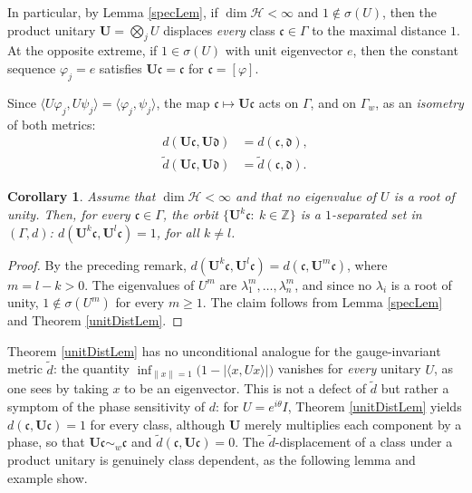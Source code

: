 \documentclass[twoside,11pt,letter]{article}
\def\bZ{\mathbb{Z}}
\def\cH{{\mathcal{H}}}
\def\fc{{\mathfrak{c}}}
\def\fd{{\mathfrak{d}}}
\newtheorem{corollary}[theorem]{Corollary}
\theoremstyle{definition}
\theoremstyle{definition}
\theoremstyle{plain}
\newenvironment{remark}[1][Remark.]{\begin{trivlist}
\item[\hskip \labelsep {\bfseries #1}]}{\end{trivlist}}
\begin{document}
\begin{remark}
In particular, by Lemma \ref{specLem}, if $\dim\cH<\infty$ and $1\notin\sigma(U)$, then the product unitary $\mathbf{U}=\bigotimes_j U$ displaces \emph{every} class $\fc\in\Gamma$ to the maximal distance $1$. At the opposite extreme, if $1\in\sigma(U)$ with unit eigenvector $e$, then the constant sequence $\varphi_j=e$ satisfies $\mathbf{U}\fc=\fc$ for $\fc=[\varphi]$.
\end{remark}

\begin{remark}
Since $\langle U\varphi_j,U\psi_j\rangle=\langle\varphi_j,\psi_j\rangle$, the map $\fc\mapsto\mathbf{U}\fc$ acts on $\Gamma$, and on $\Gamma_w$, as an \emph{isometry} of both metrics:
\begin{equation*}
\begin{split}
d(\mathbf{U}\fc,\mathbf{U}\fd)&=d(\fc,\fd),\\
\tilde d(\mathbf{U}\fc,\mathbf{U}\fd)&=\tilde d(\fc,\fd).
\end{split}
\end{equation*}
\end{remark}

\begin{corollary}\label{orbitCor}
Assume that $\dim\cH<\infty$ and that no eigenvalue of $U$ is a root of unity. Then, for every $\fc\in\Gamma$, the orbit $\{\mathbf{U}^k\fc:\:k\in\bZ\}$ is a $1$-separated set in $(\Gamma,d)$: $d(\mathbf{U}^k\fc,\mathbf{U}^l\fc)=1$, for all $k\neq l$.
\end{corollary}
\begin{proof}
By the preceding remark, $d(\mathbf{U}^k\fc,\mathbf{U}^l\fc)=d(\fc,\mathbf{U}^{m}\fc)$, where $m=l-k>0$. The eigenvalues of $U^{m}$ are $\lambda_1^{m},\ldots,\lambda_n^{m}$, and since no $\lambda_i$ is a root of unity, $1\notin\sigma(U^{m})$ for every $m\geq1$. The claim follows from Lemma \ref{specLem} and Theorem \ref{unitDistLem}.
\end{proof}

\begin{remark}
Theorem \ref{unitDistLem} has no unconditional analogue for the gauge-invariant metric $\tilde d$: the quantity $\inf_{\|x\|=1}\big(1-|\langle x,Ux\rangle|\big)$ vanishes for \emph{every} unitary $U$, as one sees by taking $x$ to be an eigenvector. This is not a defect of $\tilde d$ but rather a symptom of the phase sensitivity of $d$: for $U=e^{i\theta}I$, Theorem \ref{unitDistLem} yields $d(\fc,\mathbf{U}\fc)=1$ for every class, although $\mathbf{U}$ merely multiplies each component by a phase, so that $\mathbf{U}\fc\sim_w\fc$ and $\tilde d(\fc,\mathbf{U}\fc)=0$. The $\tilde d$-displacement of a class under a product unitary is genuinely class dependent, as the following lemma and example show.
\end{remark}
\end{document}
